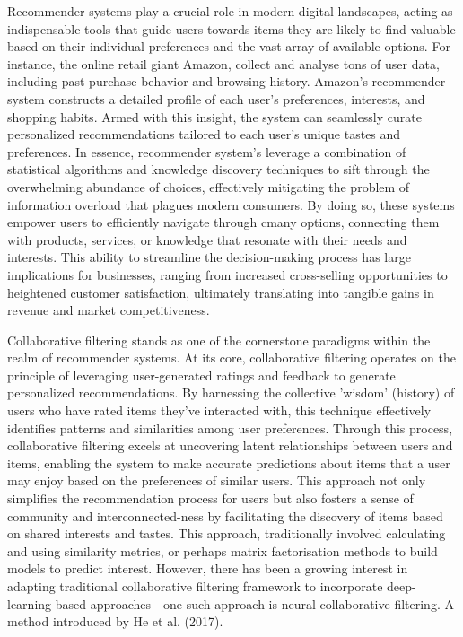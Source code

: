 Recommender systems play a crucial role in modern digital landscapes, acting as indispensable tools that guide users towards items they are likely to find valuable based on their individual preferences and the vast array of available options. For instance, the online retail giant Amazon, collect and analyse tons of user data, including past purchase behavior and browsing history. Amazon's recommender system constructs a detailed profile of each user's preferences, interests, and shopping habits. Armed with this insight, the system can seamlessly curate personalized recommendations tailored to each user's unique tastes and preferences. In essence, recommender system's leverage a combination of statistical algorithms and knowledge discovery techniques to sift through the overwhelming abundance of choices, effectively mitigating the problem of information overload that plagues modern consumers. By doing so, these systems empower users to efficiently navigate through cmany options, connecting them with products, services, or knowledge that resonate with their needs and interests. This ability to streamline the decision-making process has large implications for businesses, ranging from increased cross-selling opportunities to heightened customer satisfaction, ultimately translating into tangible gains in revenue and market competitiveness.

Collaborative filtering stands as one of the cornerstone paradigms within the realm of recommender systems. At its core, collaborative filtering operates on the principle of leveraging user-generated ratings and feedback to generate personalized recommendations. By harnessing the collective 'wisdom' (history) of users who have rated items they've interacted with, this technique effectively identifies patterns and similarities among user preferences. Through this process, collaborative filtering excels at uncovering latent relationships between users and items, enabling the system to make accurate predictions about items that a user may enjoy based on the preferences of similar users. This approach not only simplifies the recommendation process for users but also fosters a sense of community and interconnected-ness by facilitating the discovery of items based on shared interests and tastes. This approach, traditionally involved calculating and using similarity metrics, or perhaps matrix factorisation methods to build models to predict interest. However, there has been a growing interest in adapting traditional collaborative filtering framework to incorporate deep-learning based approaches - one such approach is neural collaborative filtering. A method introduced by He et al. (2017). 


